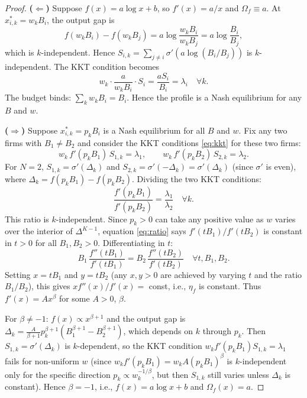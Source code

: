 \documentclass{article}
\theoremstyle{definition}
\begin{document}
\begin{proof}
\textbf{($\Leftarrow$)} Suppose $f(x) = a\log x + b$, so $f'(x) = a/x$ and
$\Omega_f \equiv a$.  At $x_{i,k}^* = w_k B_i$, the output gap is
\[
  f(w_k B_i) - f(w_k B_j) = a\log\frac{w_k B_i}{w_k B_j}
    = a\log\frac{B_i}{B_j},
\]
which is $k$-independent.  Hence $S_{i,k} = \sum_{j \neq i}\sigma'(a\log(B_i/B_j))$
is $k$-independent.  The KKT condition becomes
\[
  w_k \cdot \frac{a}{w_k B_i} \cdot S_i = \frac{a S_i}{B_i} = \lambda_i \quad\forall k.
\]
The budget binds: $\sum_k w_k B_i = B_i$.  Hence the profile is a Nash equilibrium
for any $B$ and $w$.

\textbf{($\Rightarrow$)} Suppose $x_{i,k}^* = p_k B_i$ is a Nash equilibrium
for all $B$ and $w$.  Fix any two firms with $B_1 \neq B_2$ and consider the
KKT conditions \eqref{eq:kkt} for these two firms:
\[
  w_k\,f'(p_k B_1)\,S_{1,k} = \lambda_1, \qquad
  w_k\,f'(p_k B_2)\,S_{2,k} = \lambda_2.
\]
For $N = 2$, $S_{1,k} = \sigma'(\Delta_k)$ and $S_{2,k} = \sigma'(-\Delta_k)
= \sigma'(\Delta_k)$ (since $\sigma'$ is even), where $\Delta_k = f(p_k B_1)
- f(p_k B_2)$.  Dividing the two KKT conditions:
\begin{equation}\label{eq:ratio}
  \frac{f'(p_k B_1)}{f'(p_k B_2)} = \frac{\lambda_1}{\lambda_2} \quad\forall k.
\end{equation}
This ratio is $k$-independent.  Since $p_k > 0$ can take any positive value
as $w$ varies over the interior of $\Delta^{K-1}$, equation \eqref{eq:ratio}
says $f'(t B_1)/f'(t B_2)$ is constant in $t > 0$ for all $B_1, B_2 > 0$.
Differentiating in $t$:
\[
  B_1\,\frac{f''(t B_1)}{f'(t B_1)} = B_2\,\frac{f''(t B_2)}{f'(t B_2)}
  \quad\forall t, B_1, B_2.
\]
Setting $x = t B_1$ and $y = t B_2$ (any $x, y > 0$ are achieved by varying
$t$ and the ratio $B_1/B_2$), this gives $x f''(x)/f'(x) = $ const, i.e., $\eta_f$
is constant.  Thus $f'(x) = A x^\beta$ for some $A > 0$, $\beta$.

For $\beta \neq -1$: $f(x) \propto x^{\beta+1}$ and the output gap is
$\Delta_k = \tfrac{A}{\beta+1} p_k^{\beta+1}(B_1^{\beta+1} - B_2^{\beta+1})$,
which depends on $k$ through $p_k$.  Then $S_{1,k} = \sigma'(\Delta_k)$ is
$k$-dependent, so the KKT condition $w_k f'(p_k B_1) S_{1,k} = \lambda_1$ fails
for non-uniform $w$ (since $w_k f'(p_k B_1) = w_k A(p_k B_1)^\beta$ is $k$-independent
only for the specific direction $p_k \propto w_k^{-1/\beta}$, but then $S_{1,k}$
still varies unless $\Delta_k$ is constant).  Hence $\beta = -1$, i.e., $f(x) = a\log x + b$
and $\Omega_f(x) = a$.
\end{proof}
\end{document}
